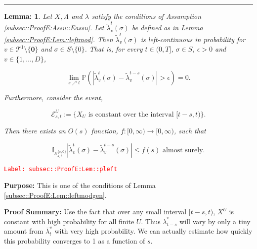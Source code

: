 \documentclass[12pt]{article}
\newcommand{\mb}{\mathbb}
\newcommand{\mc}{\mathcal}
\newcommand{\ra}{\rightarrow}
\newcommand{\ov}{\overline}
\newcommand{\te}{\text}
\newcommand{\ep}{\epsilon}
\newcommand{\tr}{\textcolor{red}}
\newcommand{\labe}[1]{\tr{\texttt{Label: #1}}}
\newcommand{\purpose}{\textbf{Purpose: }}
\newcommand{\pfsum}{\textbf{Proof Summary: }}
\newcommand{\lin}{\rule{\linewidth}{0.4 pt}}
\newcommand{\pr}{\mb{P}}							%
\renewcommand{\root}{\mathbf{0}}				%
\renewcommand{\v}{v}							%
\renewcommand{\U}{U}							%
\renewcommand{\S}{S}							%
\newcommand{\s}{\sigma}							%
\newcommand{\T}{T}								%
\renewcommand{\t}{t}							%
\renewcommand{\tt}{s}							%
\newcommand{\degr}{D}								%
\newcommand{\pup}[1]{^{#1}}							%
\newcommand{\tree}{\mc{T}}							%
\newcommand{\rxvts}[2]{X_{#1}{#2}}					%
\newcommand{\rate}[1]{\lambda_{#1}}					%
\newcommand{\ratee}[1]{\Lambda_{#1}}				%
\newcommand{\crate}[2]{\alt{\lambda}_{#1}^{#2}}		%
\newcommand{\alt}{\widetilde}						%
\newcommand{\evnt}{\mc{E}}						%
\newtheorem{lem}[thms]{Lemma: }
\begin{document}
\lin

\begin{lem}
Let \(\rxvts{}{},\ratee{}{}\) and \(\rate{}\) satisfy the conditions of Assumption \ref{subsec::ProofE:Assu::Eassu}. Let \(\crate{\v}{\t}(\s)\) be defined as in Lemma \ref{subsec::ProofE:Lem::leftmod}. Then \(\crate{\v}{\t}(\s)\) is left-continuous in probability for \(\v \in \tree\pup{1}\setminus\{\root\}\) and \(\s \in \S\setminus\{0\}\). That is, for every \(\t \in (0,\T]\), \(\s \in \S\), \(\ep > 0\) and \(\v\in \{1,\dots,\degr\}\),

\[\lim_{\tt \nearrow \t}\pr\left(|\crate{\v}{\t}(\s)- \crate{\v}{\t-\tt}(\s)| > \ep\right) = 0.\]

Furthermore, consider the event,

\[\evnt^\U_{\tt,\t} := \{\rxvts{\U}{} \te{ is constant over the interval } [\t-\tt,\t)\}.\]

Then there exists an \(O(s)\) function, \(f:[0,\infty)\ra[0,\infty)\), such that 

\[\mb{I}_{\evnt^{\{\v,\root\}}_{\tt,\t}}|\crate{\v}{\t}(\s) - \crate{\v}{\t-\tt}(\s)| \leq f(s) \te{ almost surely.}\]
\label{subsec::ProofE:Lem::pleft}
\end{lem}
\labe{subsec::ProofE:Lem::pleft}

\purpose This is one of the conditions of Lemma \ref{subsec::ProofE:Lem::leftmodgen}.

\pfsum Use the fact that over any small interval \([t-s,t)\), \(X^U\) is constant with high probability for all finite \(U\). Thus \(\ov{\lambda}^v_{t-s}\) will vary by only a tiny amount from \(\ov{\lambda}^v_t\) with very high probability. We can actually estimate how quickly this probability converges to 1 as a function of \(s\).
\end{document}
